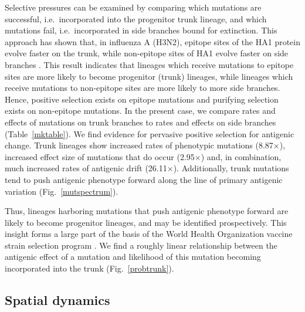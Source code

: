 \documentclass[11pt,oneside,letterpaper]{article}
\begin{document}
Selective pressures can be examined by comparing which mutations are successful, i.e.\ incorporated into the progenitor trunk lineage, and which mutations fail, i.e.\ incorporated in side branches bound for extinction.  This approach has shown that, in influenza A (H3N2), epitope sites of the HA1 protein evolve faster on the trunk, while non-epitope sites of HA1 evolve faster on side branches \cite{Bush99MBE,Wolf06,Bhatt11}.  This result indicates that lineages which receive mutations to epitope sites are more likely to become progenitor (trunk) lineages, while lineages which receive mutations to non-epitope sites are more likely to more side branches.  Hence, positive selection exists on epitope mutations and purifying selection exists on non-epitope mutations.  In the present case, we compare rates and effects of mutations on trunk branches to rates and effects on side branches (Table~\ref{mktable}).  We find evidence for pervasive positive selection for antigenic change.  Trunk lineages show increased rates of phenotypic mutations (8.87$\times$), increased effect size of mutations that do occur (2.95$\times$) and, in combination, much increased rates of antigenic drift (26.11$\times$).  Additionally, trunk mutations tend to push antigenic phenotype forward along the line of primary antigenic variation (Fig.~\ref{mutspectrum}).  

Thus, lineages harboring mutations that push antigenic phenotype forward are likely to become progenitor lineages, and may be identified prospectively.  This insight forms a large part of the basis of the World Health Organization vaccine strain selection program \cite{Barr10}.  We find a roughly linear relationship between the antigenic effect of a mutation and likelihood of this mutation becoming incorporated into the trunk (Fig.~\ref{probtrunk}).

\subsection*{Spatial dynamics}
\end{document}
